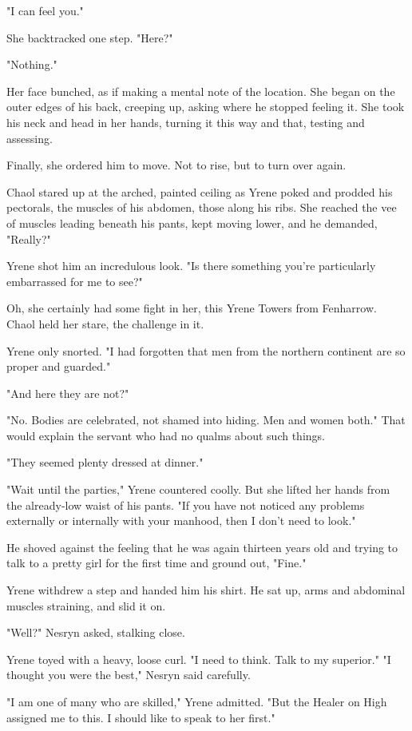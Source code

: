 "I can feel you."

She backtracked one step. "Here?"

"Nothing."

Her face bunched, as if making a mental note of the location. She began on the outer edges of his back, creeping up, asking where he stopped feeling it. She took his neck and head in her hands, turning it this way and that, testing and assessing.

Finally, she ordered him to move. Not to rise, but to turn over again.

Chaol stared up at the arched, painted ceiling as Yrene poked and prodded his pectorals, the muscles of his abdomen, those along his ribs. She reached the vee of muscles leading beneath his pants, kept moving lower, and he demanded, "Really?"

Yrene shot him an incredulous look. "Is there something you're particularly embarrassed for me to see?"

Oh, she certainly had some fight in her, this Yrene Towers from Fenharrow. Chaol held her stare, the challenge in it.

Yrene only snorted. "I had forgotten that men from the northern continent are so proper and guarded."

"And here they are not?"

"No. Bodies are celebrated, not shamed into hiding. Men and women both." That would explain the servant who had no qualms about such things.

"They seemed plenty dressed at dinner."

"Wait until the parties," Yrene countered coolly. But she lifted her hands from the already-low waist of his pants. "If you have not noticed any problems externally or internally with your manhood, then I don't need to look."

He shoved against the feeling that he was again thirteen years old and trying to talk to a pretty girl for the first time and ground out, "Fine."

Yrene withdrew a step and handed him his shirt. He sat up, arms and abdominal muscles straining, and slid it on.

"Well?" Nesryn asked, stalking close.

Yrene toyed with a heavy, loose curl. "I need to think. Talk to my superior." "I thought you were the best," Nesryn said carefully.

"I am one of many who are skilled," Yrene admitted. "But the Healer on High assigned me to this. I should like to speak to her first."

